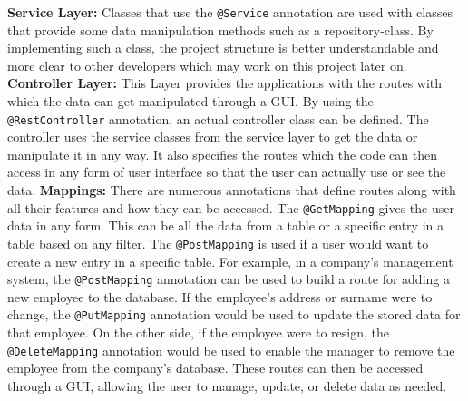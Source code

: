     \textbf{Service Layer:} \newline
    Classes that use the \texttt{@Service} annotation are used with classes that provide some data manipulation methods such as a repository-class. By implementing such a class, the project structure is better understandable and more clear to other developers which may work on this project later on.  \newline \newline
    \textbf{Controller Layer:} \newline
    This Layer provides the applications with the routes with which the data can get manipulated through a GUI. By using the \texttt{@RestController} annotation, an actual controller class can be defined. The controller uses the service classes from the service layer to get the data or manipulate it in any way. It also specifies the routes which the code can then
    access in any form of user interface so that the user can actually use or see the data. \newline \newline
    \textbf{Mappings:} \newline
    There are numerous annotations that define routes along with all their features and how they can be accessed. The \texttt{@GetMapping} gives the user data in any form. This can be all the data from a table or a specific entry in a table based on any filter. The \texttt{@PostMapping} is used if a user would want to create a new entry in a specific table. \newline
    For example, in a company's management system, the \texttt{@PostMapping} annotation can be used to build a route for adding a new employee to the database. If the employee's address or surname were to change, the \texttt{@PutMapping} annotation would be used to update the stored data for that employee. On the other side, if the employee were to resign, the \texttt{@DeleteMapping} annotation would be used to enable the manager to remove the employee from the company's database. \newline
    These routes can then be accessed through a GUI, allowing the user to manage, update, or delete data as needed.
    
